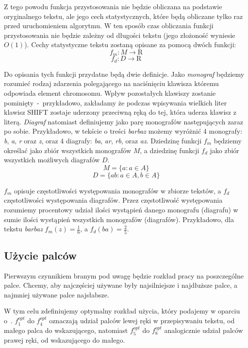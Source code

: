 \documentclass{xmgr}
\begin{document}
Z tego powodu funkcja przystosowania nie będzie obliczana na podstawie oryginalnego tekstu, ale jego cech statystycznych, które będą obliczane tylko raz przed uruchomieniem algorytmu. W ten sposób czas obliczania funkcji przystosowania nie będzie zależny od długości tekstu (jego złożoność wyniesie $ O(1) $). Cechy statystyczne tekstu zostaną opisane za pomocą dwóch funkcji:
$$ f_m : M \rightarrow \mathrm{R} $$
$$ f_d : D \rightarrow \mathrm{R} $$

Do opisania tych funkcji przydatne będą dwie definicje. Jako \emph{monograf} będziemy rozumieć rodzaj zdarzenia polegającego na naciśnięciu klawisza któremu odpowiada element chromosomu. Wpływ pozostałych klawiszy zostanie pominięty~-~przykładowo, zakładamy że podczas wpisywania wielkich liter klawisz SHIFT zostaje uderzony przeciwną ręką do tej, która uderza klawisz z literą. \emph{Diagraf} natomiast definiujemy jako parę monografów następujących zaraz po sobie. Przykładowo, w tekście o treści \emph{barbaz} możemy wyróżnić 4 monografy: \emph{b}, \emph{a}, \emph{r} oraz \emph{z}, oraz 4 diagrafy: \emph{ba}, \emph{ar}, \emph{rb}, oraz \emph{az}. Dziedzinę funkcji $ f_m $ będziemy określać jako zbiór wszystkich monografów $ M $, a dziedzinę funkcji $ f_d $ jako zbiór wszystkich możliwych diagrafów $ D $.
$$ M = \{ a : a \in A \} $$
$$ D = \{ ab : a \in A, b \in A \} $$

$ f_m $ opisuje częstotliwości występowania monografów w zbiorze tekstów, a $ f_d $ częstotliwości występowania diagrafów. Przez częstotliwość występowania rozumiemy procentowy udział ilości wystąpień danego monografu (diagrafu) w sumie ilości wystąpień wszystkich monografów (diagrafów). Przykładowo, dla tekstu \emph{barbaz} $ f_m(z) = \frac{1}{6} $, a $ f_d(ba) = \frac{2}{5} $.


\subsection{Użycie palców}

Pierwszym czynnikiem branym pod uwagę będzie rozkład pracy na poszczególne palce. Chcemy, aby najczęściej używane były najsilniejsze i najdłuższe palce, a najmniej używane palce najsłabsze.

W tym celu zdefiniujemy optymalny rozkład użycia, który podajemy w oparciu o~\cite{Eggers2003672}. $f^{opt}_1$ do $f^{opt}_4$ oznaczają udział palców lewej ręki w przepisywaniu tekstu, od małego palca do wskazującego, natomiast $f^{opt}_5$ do $f^{opt}_8$ analogicznie udział palców prawej ręki, od wskazującego do małego.\newline
\end{document}
